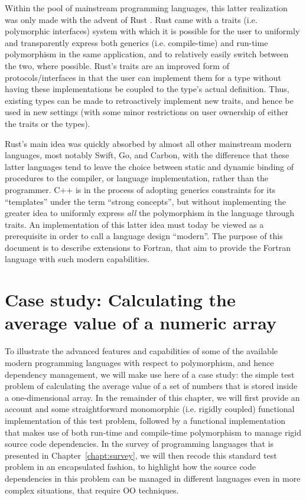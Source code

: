 \documentclass[11pt,oneside]{report}
\begin{document}
Within the pool of mainstream programming languages, this latter
realization was only made with the advent of Rust
\cite{Matsakis_2014}. Rust came with a traits (i.e. polymorphic
interfaces) system with which it is possible for the user to uniformly
and transparently express both generics (i.e. compile-time) and
run-time polymorphism in the same application, and to relatively
easily switch between the two, where possible. Rust's traits are an
improved form of protocols/interfaces in that the user can implement
them for a type without having these implementations be coupled to the
type's actual definition. Thus, existing types can be made to
retroactively implement new traits, and hence be used in new settings
(with some minor restrictions on user ownership of either the traits
or the types).

Rust's main idea was quickly absorbed by almost all other mainstream
modern languages, most notably Swift, Go, and Carbon, with the
difference that these latter languages tend to leave the choice
between static and dynamic binding of procedures to the compiler, or
language implementation, rather than the programmer. C++ is in the
process of adopting generics constraints for its ``templates'' under
the term ``strong concepts'', but without implementing the greater
idea to uniformly express \emph{all} the polymorphism in the language
through traits. An implementation of this latter idea must today be
viewed as a prerequisite in order to call a language design
``modern''. The purpose of this document is to describe extensions to
Fortran, that aim to provide the Fortran language with such modern
capabilities.


\chapter{Case study: Calculating the average value of a numeric array}

To illustrate the advanced features and capabilities of some of the
available modern programming languages with respect to polymorphism,
and hence dependency management, we will make use here of a case
study: the simple test problem of calculating the average value of a
set of numbers that is stored inside a one-dimensional array. In the
remainder of this chapter, we will first provide an account and some
straightforward monomorphic (i.e. rigidly coupled) functional
implementation of this test problem, followed by a functional
implementation that makes use of both run-time and compile-time
polymorphism to manage rigid source code dependencies. In the survey
of programming languages that is presented in
Chapter~\ref{chapt:survey}, we will then recode this standard test
problem in an encapsulated fashion, to highlight how the source code
dependencies in this problem can be managed in different languages
even in more complex situations, that require OO techniques.
\end{document}
